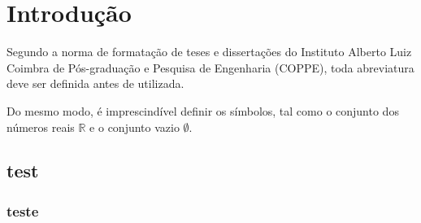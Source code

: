 \chapter{Introdução}

Segundo a norma de formata{\c c}\~ao de teses e disserta{\c c}\~oes do
Instituto Alberto Luiz Coimbra de P\'os-gradua{\c c}\~ao e Pesquisa de
Engenharia (COPPE), toda abreviatura deve ser definida antes de
utilizada.

Do mesmo modo, \'e imprescind\'ivel definir os s\'imbolos, tal como o
conjunto dos n\'umeros reais $\mathbb{R}$ e o conjunto vazio $\emptyset$.

\section{test}
\subsection{teste}